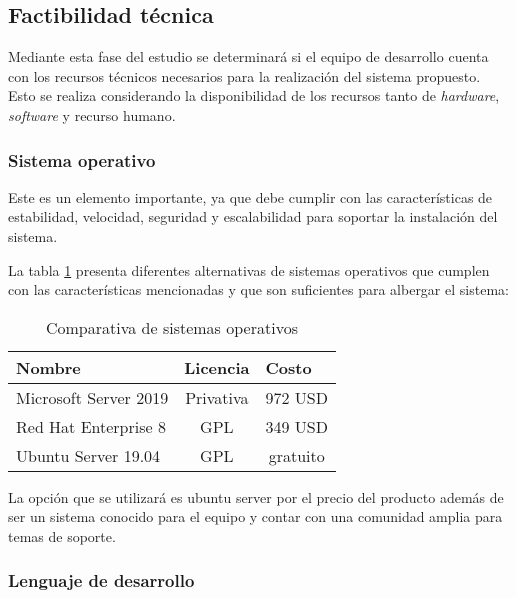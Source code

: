 \subsection{Factibilidad técnica}

Mediante esta fase del estudio se determinará si el equipo de desarrollo cuenta con los recursos técnicos necesarios para la realización del sistema propuesto. Esto se realiza considerando la disponibilidad de los recursos tanto de \textit{hardware}, \textit{software} y recurso humano.

\subsubsection{Sistema operativo}

Este es un elemento importante, ya que debe cumplir con las características de estabilidad, velocidad, seguridad y escalabilidad para soportar la instalación del sistema.


La tabla \ref{tab:options_so} presenta diferentes alternativas de sistemas operativos que cumplen con las características mencionadas y que son suficientes para albergar el sistema:

\begin{table}[h!]
    \centering
    \begin{tabular}{|l|l|l|}
    \hline
    Nombre                & Licencia                       & Costo                         \\ \hline
    Microsoft Server 2019 & \multicolumn{1}{c|}{Privativa} & \multicolumn{1}{c|}{972 USD}  \\ \hline
    Red Hat Enterprise 8  & \multicolumn{1}{c|}{GPL}       & \multicolumn{1}{c|}{349 USD}  \\ \hline
    \rowcolor[HTML]{66BB6A}
    Ubuntu Server 19.04   & \multicolumn{1}{c|}{\cellcolor[HTML]{66BB6A}GPL}       & \multicolumn{1}{c|}{\cellcolor[HTML]{66BB6A}gratuito} \\ \hline
    \end{tabular}
    \caption{Comparativa de sistemas operativos}
    \label{tab:options_so}
    \end{table}

La opción que se utilizará es ubuntu server por el precio del producto además de ser un sistema conocido para el equipo y contar con una comunidad amplia para temas de soporte.

\subsubsection{Lenguaje de desarrollo}

